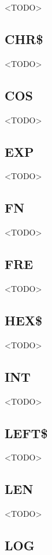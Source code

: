 <TODO>

\subsection{CHR\$}

<TODO>

\subsection{COS}

<TODO>

\subsection{EXP}

<TODO>

\subsection{FN}

<TODO>

\subsection{FRE}

<TODO>

\subsection{HEX\$}

<TODO>

\subsection{INT}

<TODO>

\subsection{LEFT\$}

<TODO>

\subsection{LEN}

<TODO>

\subsection{LOG}

